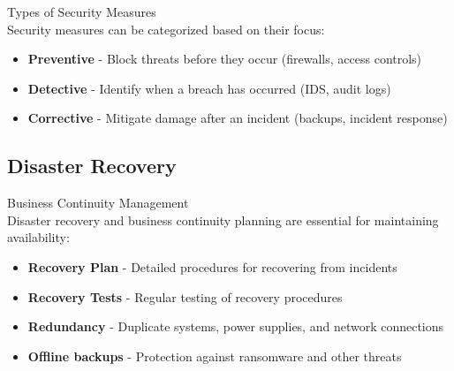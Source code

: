 \begin{definition}{Types of Security Measures}\\
Security measures can be categorized based on their focus:
\begin{itemize}
    \item \textbf{Preventive} - Block threats before they occur (firewalls, access controls)
    \item \textbf{Detective} - Identify when a breach has occurred (IDS, audit logs)
    \item \textbf{Corrective} - Mitigate damage after an incident (backups, incident response)
\end{itemize}
\end{definition}

\subsection{Disaster Recovery}

\begin{concept}{Business Continuity Management}\\
Disaster recovery and business continuity planning are essential for maintaining availability:
\begin{itemize}
    \item \textbf{Recovery Plan} - Detailed procedures for recovering from incidents
    \item \textbf{Recovery Tests} - Regular testing of recovery procedures
    \item \textbf{Redundancy} - Duplicate systems, power supplies, and network connections
    \item \textbf{Offline backups} - Protection against ransomware and other threats
\end{itemize}
\end{concept}

